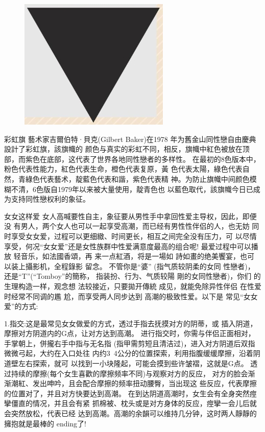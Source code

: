 \documentclass[12pt,UTF8]{ctexbook}
\begin{document}
\begin{figure}[htbp]
	\centering
	\includegraphics[width=0.7\linewidth]{9}
	\caption{}
	\label{fig:1}
\end{figure}

彩虹旗
藝术家吉爾伯特·貝克(Gilbert Baker)在1978
年为舊金山同性戀自由慶典設計了彩虹旗，該旗幟的
颜色与真实的彩虹不同，相反，旗幟中紅色被放在顶
部，而紫色在底部，这代表了世界各地同性戀者的多样性。
在最初的8色版本中，粉色代表性能力，紅色代表生命，橙色代表复原，黃
色代表太陽，綠色代表自然，青綠色代表藝术，靛藍色代表和諧，紫色代表精
神。为防止旗幟中间颜色模糊不清，6色版自1979年以来被大量使用，靛青色也
以藍色取代，該旗幟今日已成为支持同性戀权利的象征。

女女这样爱
女人高喊要性自主，象征要从男性手中拿回性爱主导权，因此，即便没
有男人，两个女人也可以一起享受高潮，而已经有男性性伴侣的人，也无妨
同时享受女女爱，过程可以更细緻、时间更长，相互之间完全没有压力，可
以尽情享受，何况“女女爱”还是女性族群中性爱满意度最高的组合呢!
最爱过程中可以播放
轻音乐，如法國香頌，再
来一点紅酒，将是一場如
詩如畫的绝美饗宴，也可
以装上攝影机，全程錄影
留念。
不管你是“婆”
(指气质较阴柔的女同
性戀者)，还是“T”(“Tomboy”的簡称，
指装扮、行为、气质较陽
剛的女同性戀者)，你们
的生理构造一样，观念想
法较接近，只要拋开傳統
成见，就能免除异性伴侣
在性爱时经常不同调的尷
尬，而享受两人同步达到
高潮的极致性爱。以下是
常见“女女爱”的方式:

1.指交:这是最常见女女做爱的方式，透过手指去抚摸对方的阴蒂，或
插入阴道，摩擦对方阴道内的G点，让对方达到高潮。
进行指交时，你需与伴侣正面相对，手掌朝上，併攏右手中指与无名指
(指甲需剪短且清洁过)，进入对方阴道后双指微微弓起，大约在入口处往
内约3~4公分的位置探索，利用指腹缓缓摩擦，沿着阴道壁左右探索，就可
以找到一小块隆起，可能会摸到些许皱褶，这就是G点。
透过持续的摩擦(每个女生喜歡的摩擦频率不同)与观察对方的反应，
对方的脸会渐渐潮紅、发出呻吟，且会配合摩擦的频率扭动腰臀，当出现这
些反应，代表摩擦的位置对了，并且对方快要达到高潮。
在到达阴道高潮时，女生会有全身突然痙攣僵直的情况，并且会有紧
抓棉被、枕头或是对方身体的反应，痙攣一会儿后就会突然放松，代表已经
达到高潮。高潮的余韻可以维持几分钟，这时两人靜靜的擁抱就是最棒的
ending了!
\end{document}
